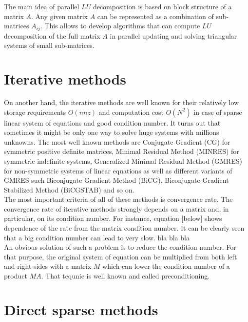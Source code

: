 The main idea of parallel $LU$ decomposition is based on block structure of a matrix $A$. Any given matrix $A$ can be represented as a combination of sub-matrices $A_{ij}$. This allows to develop algorithms that can compute $LU$ decomposition of the full matrix $A$ in parallel updating and solving triangular systems of small sub-matrices.

  
\section{Iterative methods}
\label{subseq:iterative methods}
On another hand, the iterative methods are well known for their relatively low storage requirements $O(nnz)$ and computation cost $O(N^2)$ in case of sparse linear system of equations and good condition number. It turns out that sometimes it might be only one way to solve huge systems with millions unknowns. The most well known methods are Conjugate Gradient (CG) for symmetric positive definite matrices, Minimal Residual Method (MINRES) for symmetric indefinite systems, Generalized Minimal Residual Method (GMRES) for non-symmetric systems of linear equations as well as different variants of GMRES such Biconjugate Gradient Method (BiCG), Biconjugate Gradient Stabilized Method (BiCGSTAB) and so on.\\ 

The most important criteria of all of these methods is convergence rate. The convergence rate of iterative methods strongly depends on a matrix and, in particular, on its condition number. For instance, equation [below] shows dependence of the rate from the matrix condition number. It can be clearly seen that a big condition number can lead to very slow. bla bla bla \\


An obvious solution of such a problem is to reduce the condition number. For that purpose, the original system of equation can be multiplied from both left and right sides with a matrix $M$ which can lower the condition number of a product $MA$. That tequnic is well known and called preconditioning. 


\section{Direct sparse methods}
\label{subseq:sparse methods}

